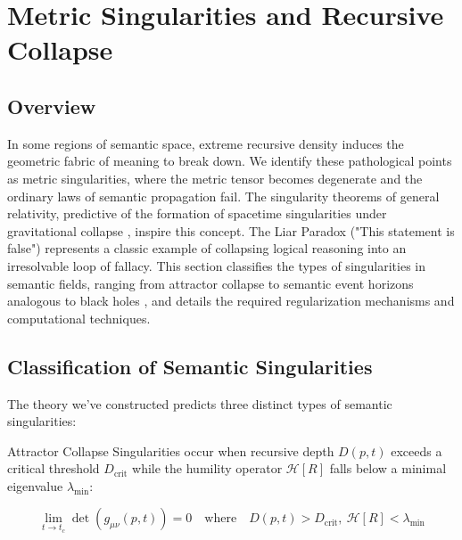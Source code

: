 \chapter{Metric Singularities and Recursive Collapse}
\label{12:metric_singularities_and_recursive_collapse}


\section{Overview}
\label{12.1:overview}

In some regions of semantic space, extreme recursive density induces the geometric fabric of meaning to break down. We identify these pathological points as metric singularities, where the metric tensor becomes degenerate and the ordinary laws of semantic propagation fail. The singularity theorems of general relativity, predictive of the formation of spacetime singularities under gravitational collapse \autocite{Penrose1965}, inspire this concept. The Liar Paradox ("This statement is false") represents a classic example of collapsing logical reasoning into an irresolvable loop of fallacy. This section classifies the types of singularities in semantic fields, ranging from attractor collapse to semantic event horizons analogous to black holes \autocite{Hawking1974}, and details the required regularization mechanisms and computational techniques.


\section{Classification of Semantic Singularities}
\label{12.2:classification_of_semantic_singularities}

The theory we've constructed predicts three distinct types of semantic singularities:

Attractor Collapse Singularities occur when recursive depth \(D(p, t)\) exceeds a critical threshold \(D_{\text{crit}}\) while the humility operator \(\mathcal{H}[R]\) falls below a minimal eigenvalue \(\lambda_{\text{min}}\):

\begin{equation}
\lim_{t \to t_c} \det(g_{\mu\nu}(p, t)) = 0 \quad \text{where} \quad D(p, t) > D_{\text{crit}},\ \mathcal{H}[R] < \lambda_{\text{min}}
\end{equation}

